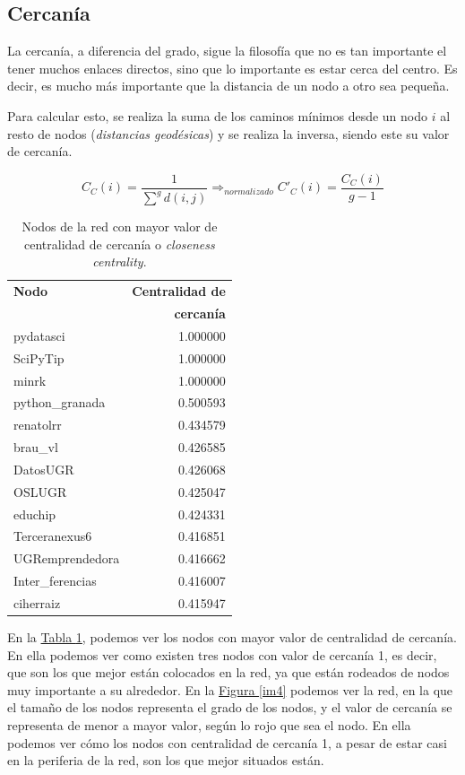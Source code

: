 \documentclass[paper=a4, fontsize=11pt]{article} %
\numberwithin{equation}{section} %
\numberwithin{figure}{section} %
\numberwithin{table}{section} %
\begin{document}
\subsection{Cercanía}

La cercanía, a diferencia del grado, sigue la filosofía que no es tan importante el tener muchos enlaces directos, sino que lo importante es estar cerca del centro. Es decir, es mucho más importante que la distancia de un nodo a otro sea pequeña.

Para calcular esto, se realiza la suma de los caminos mínimos desde un nodo $i$ al resto de nodos (\textit{distancias geodésicas}) y se realiza la inversa, siendo este su valor de cercanía.

\begin{displaymath}
    C_C(i)=\frac{1}{\sum^gd(i,j)} \Longrightarrow_{normalizado} C'_C(i) = \frac{C_C(i)}{g-1}
\end{displaymath}

\begin{table}[H]
\begin{tabular}{l|r}
\textbf{Nodo} & \textbf{Centralidad de} \\
& \textbf{cercanía} \\
\hline
pydatasci & 1.000000 \\
SciPyTip & 1.000000 \\
minrk & 1.000000 \\
python\_granada & 0.500593 \\
renatolrr & 0.434579 \\
brau\_vl & 0.426585 \\
DatosUGR & 0.426068 \\
OSLUGR & 0.425047 \\
educhip & 0.424331 \\
Terceranexus6 & 0.416851 \\
UGRemprendedora & 0.416662 \\
Inter\_ferencias & 0.416007 \\
ciherraiz & 0.415947 \\
\end{tabular}
\label{close}
\caption{Nodos de la red con mayor valor de centralidad de cercanía o \textit{closeness centrality}.}
\end{table}

En la \hyperref[close]{Tabla \ref*{close}}, podemos ver los nodos con mayor valor de centralidad de cercanía. En ella podemos ver como existen tres nodos con valor de cercanía 1, es decir, que son los que mejor están colocados en la red, ya que están rodeados de nodos muy importante a su alrededor. En la \hyperref[im4]{Figura \ref*{im4}} podemos ver la red, en la que el tamaño de los nodos representa el grado de los nodos, y el valor de cercanía se representa de menor a mayor valor, según lo rojo que sea el nodo. En ella podemos ver cómo los nodos con centralidad de cercanía 1, a pesar de estar casi en la periferia de la red, son los que mejor situados están.
\end{document}
